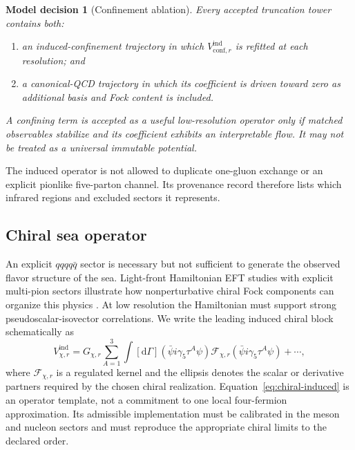 \documentclass[11pt]{article}
\newtheorem{decision}[definition]{Model decision}
\newcommand{\dd}{\mathrm{d}}
\newcommand{\cF}{\mathcal F}
\newcommand{\ind}{\mathrm{ind}}
\newcommand{\conf}{\mathrm{conf}}
\begin{document}
\begin{decision}[Confinement ablation]
Every accepted truncation tower contains both:
\begin{enumerate}
 \item an induced-confinement trajectory in which
 \(V_{\conf,r}^{\ind}\) is refitted at each resolution; and
 \item a canonical-QCD trajectory in which its coefficient is driven toward
 zero as additional basis and Fock content is included.
\end{enumerate}
A confining term is accepted as a useful low-resolution operator only if
matched observables stabilize and its coefficient exhibits an interpretable
flow.  It may not be treated as a universal immutable potential.
\label{dec:confinement-ablation}
\end{decision}

The induced operator is not allowed to duplicate one-gluon exchange or an
explicit pionlike five-parton channel.  Its provenance record therefore lists
which infrared regions and excluded sectors it represents.

\subsection{Chiral sea operator}

An explicit \(qqqq\bar q\) sector is necessary but not sufficient to generate
the observed flavor structure of the sea.  Light-front Hamiltonian EFT studies
with explicit multi-pion sectors illustrate how nonperturbative chiral Fock
components can organize this physics \cite{Cao2026}.  At low resolution the Hamiltonian
must support strong pseudoscalar-isovector correlations.  We write the leading
induced chiral block schematically as
\begin{equation}
 V_{\chi,r}^{\ind}
 =G_{\chi,r}
 \sum_{A=1}^{3}
 \int [\dd\Gamma]
 \left(\bar\psi i\gamma_5\tau^A\psi\right)
 \cF_{\chi,r}
 \left(\bar\psi i\gamma_5\tau^A\psi\right)
 +\cdots,
 \label{eq:chiral-induced}
\end{equation}
where \(\cF_{\chi,r}\) is a regulated kernel and the ellipsis denotes the
scalar or derivative partners required by the chosen chiral realization.
Equation~\eqref{eq:chiral-induced} is an operator template, not a commitment to
one local four-fermion approximation.  Its admissible implementation must be
calibrated in the meson and nucleon sectors and must reproduce the appropriate
chiral limits to the declared order.
\end{document}
